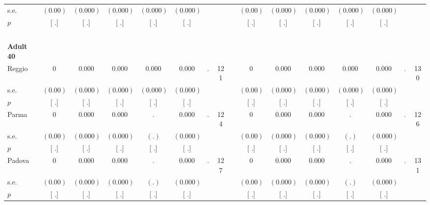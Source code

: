 \begin{longtable}{L{8em} c c c c c c c p{1em} c c c c c c c}
\quad \quad \quad \quad s.e.& $ (     0.00)$ & $ (    0.000)$ & $ (    0.000)$ & $ (    0.000)$ & $ (    0.000)$ & & & & $ (     0.00)$ & $ (    0.000)$ & $ (    0.000)$ & $ (    0.000)$ & $ (    0.000)$ & &  \\*
\quad \quad \quad \quad $ p$ & [        .] & [        .] & [        .] & [        .] & [        .] & & & & [        .] & [        .] & [        .] & [        .] & [        .] & &  \\[1em]
~\\[1em]
\quad \quad \textbf{Adult 40} & & & & & & & & & & & & & & & \\* 
\quad \quad \quad Reggio& 0 &     0.000 &     0.000 &     0.000 &     0.000 &         . &       121 & & 0 &     0.000 &     0.000 &     0.000 &     0.000 &         . &       130  \\*
\quad \quad \quad \quad s.e.& $ (     0.00)$ & $ (    0.000)$ & $ (    0.000)$ & $ (    0.000)$ & $ (    0.000)$ & & & & $ (     0.00)$ & $ (    0.000)$ & $ (    0.000)$ & $ (    0.000)$ & $ (    0.000)$ & &  \\*
\quad \quad \quad \quad $ p$ & [        .] & [        .] & [        .] & [        .] & [        .] & & & & [        .] & [        .] & [        .] & [        .] & [        .] & &  \\[1em]
\quad \quad \quad Parma& 0 &     0.000 &     0.000 &         . &     0.000 &         . &       124 & & 0 &     0.000 &     0.000 &         . &     0.000 &         . &       126  \\*
\quad \quad \quad \quad s.e.& $ (     0.00)$ & $ (    0.000)$ & $ (    0.000)$ & $ (        .)$ & $ (    0.000)$ & & & & $ (     0.00)$ & $ (    0.000)$ & $ (    0.000)$ & $ (        .)$ & $ (    0.000)$ & &  \\*
\quad \quad \quad \quad $ p$ & [        .] & [        .] & [        .] & [        .] & [        .] & & & & [        .] & [        .] & [        .] & [        .] & [        .] & &  \\[1em]
\quad \quad \quad Padova& 0 &     0.000 &     0.000 &         . &     0.000 &         . &       127 & & 0 &     0.000 &     0.000 &         . &     0.000 &         . &       131  \\*
\quad \quad \quad \quad s.e.& $ (     0.00)$ & $ (    0.000)$ & $ (    0.000)$ & $ (        .)$ & $ (    0.000)$ & & & & $ (     0.00)$ & $ (    0.000)$ & $ (    0.000)$ & $ (        .)$ & $ (    0.000)$ & &  \\*
\quad \quad \quad \quad $ p$ & [        .] & [        .] & [        .] & [        .] & [        .] & & & & [        .] & [        .] & [        .] & [        .] & [        .] & &  \\[1em]

\end{longtable}

